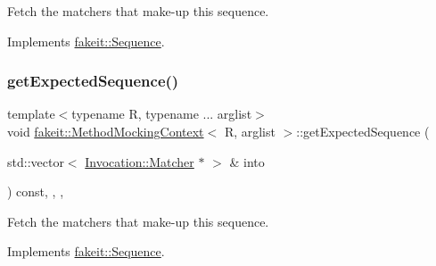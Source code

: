 Fetch the matchers that make-\/up this sequence. 



Implements \mbox{\hyperlink{classfakeit_1_1Sequence_aa1a1e4ad2fcac3379ba38f250bf06884}{fakeit\+::\+Sequence}}.

\mbox{\label{classfakeit_1_1MethodMockingContext_ab88d912b17801968fab8443079e2eabc}} 
\subsubsection{\texorpdfstring{getExpectedSequence()}{getExpectedSequence()}\hspace{0.1cm}{\footnotesize\ttfamily [7/9]}}
{\footnotesize\ttfamily template$<$typename R, typename ... arglist$>$ \\
void \mbox{\hyperlink{classfakeit_1_1MethodMockingContext}{fakeit\+::\+Method\+Mocking\+Context}}$<$ R, arglist $>$\+::get\+Expected\+Sequence (\begin{DoxyParamCaption}\item[{std\+::vector$<$ \mbox{\hyperlink{structfakeit_1_1Invocation_1_1Matcher}{Invocation\+::\+Matcher}} $\ast$ $>$ \&}]{into }\end{DoxyParamCaption}) const\hspace{0.3cm}{\ttfamily [inline]}, {\ttfamily [override]}, {\ttfamily [protected]}, {\ttfamily [virtual]}}



Fetch the matchers that make-\/up this sequence. 



Implements \mbox{\hyperlink{classfakeit_1_1Sequence_aa1a1e4ad2fcac3379ba38f250bf06884}{fakeit\+::\+Sequence}}.

\mbox{\label{classfakeit_1_1MethodMockingContext_ab88d912b17801968fab8443079e2eabc}} 
